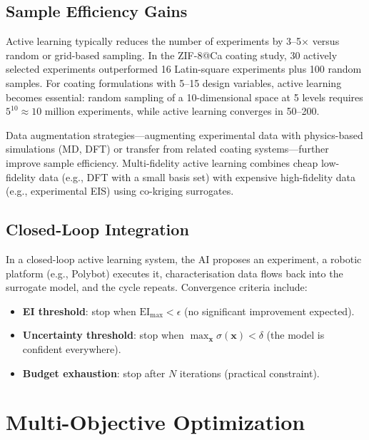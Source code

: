 \documentclass[11pt,a4paper]{article}
\begin{document}
\subsection{Sample Efficiency Gains}

Active learning typically reduces the number of experiments by 3--5$\times$ versus random or grid-based sampling.
In the ZIF-8@Ca coating study, 30 actively selected experiments outperformed 16 Latin-square experiments plus 100 random samples.
For coating formulations with 5--15 design variables, active learning becomes essential: random sampling of a 10-dimensional space at 5 levels requires $5^{10} \approx 10$ million experiments, while active learning converges in 50--200.

Data augmentation strategies---augmenting experimental data with physics-based simulations (MD, DFT) or transfer from related coating systems---further improve sample efficiency.
Multi-fidelity active learning combines cheap low-fidelity data (e.g., DFT with a small basis set) with expensive high-fidelity data (e.g., experimental EIS) using co-kriging surrogates.

\subsection{Closed-Loop Integration}

In a closed-loop active learning system, the AI proposes an experiment, a robotic platform (e.g., Polybot) executes it, characterisation data flows back into the surrogate model, and the cycle repeats.
Convergence criteria include:
\begin{itemize}[nosep]
  \item \textbf{EI threshold}: stop when $\text{EI}_\text{max} < \epsilon$ (no significant improvement expected).
  \item \textbf{Uncertainty threshold}: stop when $\max_{\mathbf{x}} \sigma(\mathbf{x}) < \delta$ (the model is confident everywhere).
  \item \textbf{Budget exhaustion}: stop after $N$ iterations (practical constraint).
\end{itemize}

\section{Multi-Objective Optimization}
\label{sec:moopt}
\end{document}
